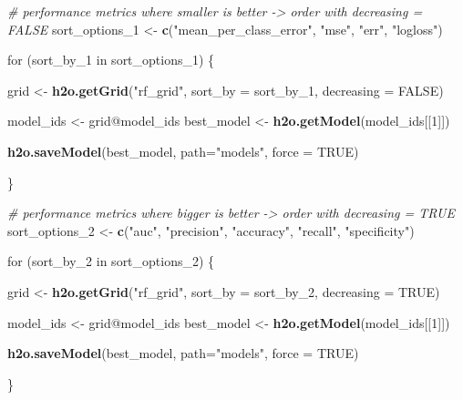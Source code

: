 \documentclass[]{article}
\newenvironment{Shaded}{\begin{snugshade}}{\end{snugshade}}
\newcommand{\KeywordTok}[1]{\textcolor[rgb]{0.13,0.29,0.53}{\textbf{{#1}}}}
\newcommand{\DataTypeTok}[1]{\textcolor[rgb]{0.13,0.29,0.53}{{#1}}}
\newcommand{\DecValTok}[1]{\textcolor[rgb]{0.00,0.00,0.81}{{#1}}}
\newcommand{\StringTok}[1]{\textcolor[rgb]{0.31,0.60,0.02}{{#1}}}
\newcommand{\CommentTok}[1]{\textcolor[rgb]{0.56,0.35,0.01}{\textit{{#1}}}}
\newcommand{\OtherTok}[1]{\textcolor[rgb]{0.56,0.35,0.01}{{#1}}}
\newcommand{\NormalTok}[1]{{#1}}
\begin{document}
\begin{Shaded}
\begin{Highlighting}[]
\CommentTok{# performance metrics where smaller is better -> order with decreasing = FALSE}
\NormalTok{sort_options_1 <-}\StringTok{ }\KeywordTok{c}\NormalTok{(}\StringTok{"mean_per_class_error"}\NormalTok{, }\StringTok{"mse"}\NormalTok{, }\StringTok{"err"}\NormalTok{, }\StringTok{"logloss"}\NormalTok{)}

\NormalTok{for (sort_by_1 in sort_options_1) \{}
  
  \NormalTok{grid <-}\StringTok{ }\KeywordTok{h2o.getGrid}\NormalTok{(}\StringTok{"rf_grid"}\NormalTok{, }\DataTypeTok{sort_by =} \NormalTok{sort_by_1, }\DataTypeTok{decreasing =} \OtherTok{FALSE}\NormalTok{)}
  
  \NormalTok{model_ids <-}\StringTok{ }\NormalTok{grid@model_ids}
  \NormalTok{best_model <-}\StringTok{ }\KeywordTok{h2o.getModel}\NormalTok{(model_ids[[}\DecValTok{1}\NormalTok{]])}
  
  \KeywordTok{h2o.saveModel}\NormalTok{(best_model, }\DataTypeTok{path=}\StringTok{"models"}\NormalTok{, }\DataTypeTok{force =} \OtherTok{TRUE}\NormalTok{)}
  
\NormalTok{\}}


\CommentTok{# performance metrics where bigger is better -> order with decreasing = TRUE}
\NormalTok{sort_options_2 <-}\StringTok{ }\KeywordTok{c}\NormalTok{(}\StringTok{"auc"}\NormalTok{, }\StringTok{"precision"}\NormalTok{, }\StringTok{"accuracy"}\NormalTok{, }\StringTok{"recall"}\NormalTok{, }\StringTok{"specificity"}\NormalTok{)}

\NormalTok{for (sort_by_2 in sort_options_2) \{}
  
  \NormalTok{grid <-}\StringTok{ }\KeywordTok{h2o.getGrid}\NormalTok{(}\StringTok{"rf_grid"}\NormalTok{, }\DataTypeTok{sort_by =} \NormalTok{sort_by_2, }\DataTypeTok{decreasing =} \OtherTok{TRUE}\NormalTok{)}
  
  \NormalTok{model_ids <-}\StringTok{ }\NormalTok{grid@model_ids}
  \NormalTok{best_model <-}\StringTok{ }\KeywordTok{h2o.getModel}\NormalTok{(model_ids[[}\DecValTok{1}\NormalTok{]])}
  
  \KeywordTok{h2o.saveModel}\NormalTok{(best_model, }\DataTypeTok{path=}\StringTok{"models"}\NormalTok{, }\DataTypeTok{force =} \OtherTok{TRUE}\NormalTok{)}
  
\NormalTok{\}}
\end{Highlighting}
\end{Shaded}
\end{document}
